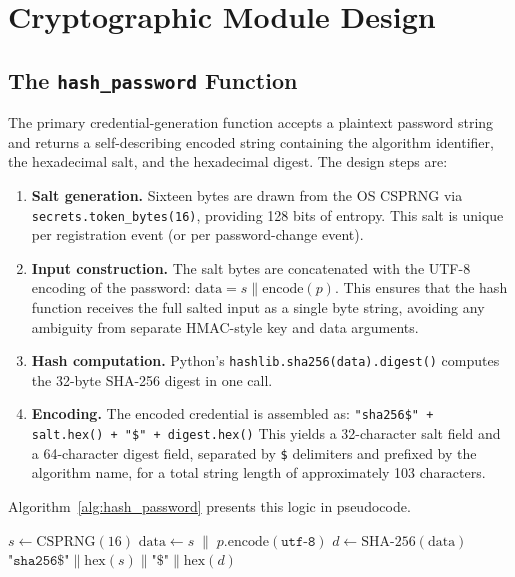 \section{Cryptographic Module Design}
\label{sec:arch_crypto}

\subsection{The \texttt{hash\_password} Function}
\label{sec:arch_hash}

The primary credential-generation function accepts a plaintext password string and returns a self-describing encoded string containing the algorithm identifier, the hexadecimal salt, and the hexadecimal digest. The design steps are:

\begin{enumerate}
  \item \textbf{Salt generation.} Sixteen bytes are drawn from the OS CSPRNG via \texttt{secrets.token\_bytes(16)}, providing 128 bits of entropy. This salt is unique per registration event (or per password-change event).

  \item \textbf{Input construction.} The salt bytes are concatenated with the UTF-8 encoding of the password: $\text{data} = s \| \mathrm{encode}(p)$. This ensures that the hash function receives the full salted input as a single byte string, avoiding any ambiguity from separate HMAC-style key and data arguments.

  \item \textbf{Hash computation.} Python's \texttt{hashlib.sha256(data).digest()} computes the 32-byte SHA-256 digest in one call.

  \item \textbf{Encoding.} The encoded credential is assembled as: \newline
    \texttt{"sha256\$" + salt.hex() + "\$" + digest.hex()} \newline
    This yields a 32-character salt field and a 64-character digest field, separated by \texttt{\$} delimiters and prefixed by the algorithm name, for a total string length of approximately 103 characters.
\end{enumerate}

Algorithm~\ref{alg:hash_password} presents this logic in pseudocode.

\begin{algorithm}[H]
\caption{hash\_password($p$)}
\label{alg:hash_password}
$s \leftarrow \mathrm{CSPRNG}(16)$ 
$\text{data} \leftarrow s \;\|\; p.\mathrm{encode}(\texttt{utf-8})$\;
$d \leftarrow \mathrm{SHA\text{-}256}(\text{data})$\;
\Return $\texttt{"sha256\$"} \| \mathrm{hex}(s) \| \texttt{"\$"} \| \mathrm{hex}(d)$\;
\end{algorithm}

